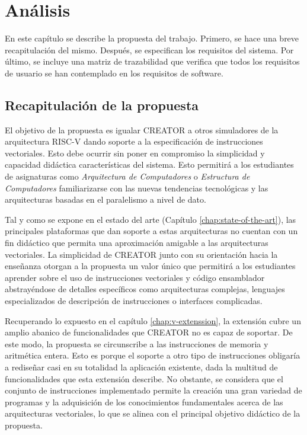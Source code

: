 \chapter{Análisis}\label{chap:analysis}
En este capítulo se describe la propuesta del trabajo. Primero, se hace una
breve recapitulación del mismo. Después, se especifican los requisitos del
sistema. Por último, se incluye una matriz de trazabilidad que verifica que
todos los requisitos de usuario se han contemplado en los requisitos de
software.

\section{Recapitulación de la propuesta}

El objetivo de la propuesta es igualar CREATOR a otros simuladores de la
arquitectura RISC-V dando soporte a la especificación de instrucciones
vectoriales. Esto debe ocurrir sin poner en compromiso la simplicidad y
capacidad didáctica características del sistema. Esto permitirá a los
estudiantes de asignaturas como \textit{Arquitectura de Computadores} o
\textit{Estructura de Computadores} familiarizarse con las nuevas tendencias
tecnológicas y las arquitecturas basadas en el paralelismo a nivel de dato.

Tal y como se expone en el estado del arte (Capítulo \ref{chap:state-of-the-art}), las
principales plataformas que dan soporte a estas arquitecturas no cuentan con un
fin didáctico que permita una aproximación amigable a las arquitecturas
vectoriales. La simplicidad de CREATOR junto con su orientación hacia la enseñanza otorgan a la
propuesta un valor único que permitirá a los estudiantes aprender sobre el uso
de instrucciones vectoriales y código ensamblador abstrayéndose de detalles
específicos como arquitecturas complejas, lenguajes especializados de
descripción de instrucciones o interfaces complicadas.

Recuperando lo expuesto en el capítulo \ref{chap:v-extenssion}, la extensión cubre
un amplio abanico de funcionalidades que CREATOR no es capaz de soportar. De este modo, la propuesta se circunscribe a las instrucciones de memoria y aritmética entera. Esto es porque el
soporte a otro tipo de instrucciones obligaría a rediseñar casi en su totalidad
la aplicación existente, dada la multitud de funcionalidades que esta extensión
describe. No obstante, se considera que el conjunto de instrucciones
implementado permite la creación una gran variedad de programas y la
adquisición de los conocimientos fundamentales acerca de las arquitecturas
vectoriales, lo que se alinea con el principal objetivo didáctico de la propuesta.

